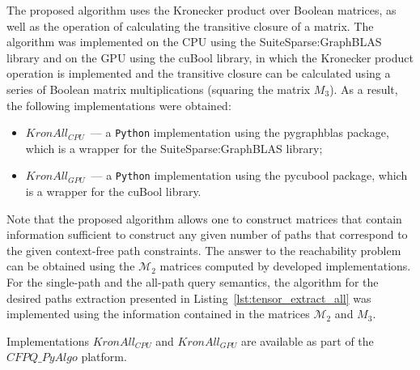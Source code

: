 The proposed algorithm uses the Kronecker product over Boolean matrices, as well as the operation of calculating the transitive closure of a matrix. The algorithm was implemented on the CPU using the SuiteSparse:GraphBLAS library and on the GPU using the cuBool library, in which the Kronecker product operation is implemented and the transitive closure can be calculated using a series of Boolean matrix multiplications (squaring the matrix $M_3$). As a result, the following implementations were obtained:
\begin{itemize}
    \item $\textit{KronAll}_{\textit{CPU}}$~--- a \texttt{Python} implementation using the pygraphblas package, which is a wrapper for the SuiteSparse:GraphBLAS library;
    \item $\textit{KronAll}_{\textit{GPU}}$~--- a \texttt{Python} implementation using the pycubool package, which is a wrapper for the cuBool library.
\end{itemize}

Note that the proposed algorithm allows one to construct matrices that contain information sufficient to construct any given number of paths that correspond to the given context-free path constraints. The answer to the reachability problem can be obtained using the $\mathcal{M}_2$ matrices computed by developed implementations. For the single-path and the all-path query semantics, the algorithm for the desired paths extraction presented in Listing~\ref{lst:tensor_extract_all} was implemented using the information contained in the matrices $\mathcal{M}_2$ and $M_3$.

Implementations $\textit{KronAll}_{\textit{CPU}}$ and $\textit{KronAll}_{\textit{GPU}}$ are available as part of the $\textit{CFPQ\_PyAlgo}$ platform.

\clearpage
